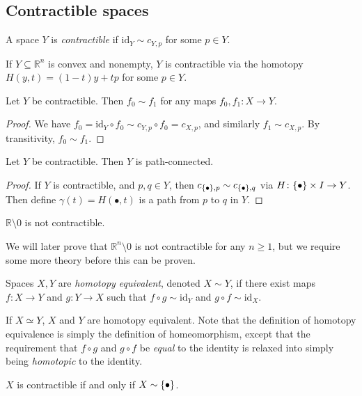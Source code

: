 \subsection{Contractible spaces}
\begin{definition}
	A space \( Y \) is \emph{contractible} if \( \mathrm{id}_Y \sim c_{Y,p} \) for some \( p \in Y \).
\end{definition}
\begin{example}
	If \( Y \subseteq \mathbb R^n \) is convex and nonempty, \( Y \) is contractible via the homotopy \( H(y,t) = (1-t)y + tp \) for some \( p \in Y \).
\end{example}
\begin{proposition}
	Let \( Y \) be contractible.
	Then \( f_0 \sim f_1 \) for any maps \( f_0, f_1 \colon X \to Y \).
\end{proposition}
\begin{proof}
	We have \( f_0 = \mathrm{id}_Y \circ f_0 \sim c_{Y,p} \circ f_0 = c_{X,p} \), and similarly \( f_1 \sim c_{X,p} \).
	By transitivity, \( f_0 \sim f_1 \).
\end{proof}
\begin{corollary}
	Let \( Y \) be contractible.
	Then \( Y \) is path-connected.
\end{corollary}
\begin{proof}
	If \( Y \) is contractible, and \( p, q \in Y \), then \( c_{\qty{\bullet},p} \sim c_{\qty{\bullet},q} \) via \( H \colon \qty{\bullet} \times I \to Y \).
	Then define \( \gamma(t) = H(\bullet,t) \) is a path from \( p \) to \( q \) in \( Y \).
\end{proof}
\begin{example}
	\( \mathbb R \setminus \qty{0} \) is not contractible.
\end{example}
We will later prove that \( \mathbb R^n \setminus \qty{0} \) is not contractible for any \( n \geq 1 \), but we require some more theory before this can be proven.
\begin{definition}
	Spaces \( X, Y \) are \emph{homotopy equivalent}, denoted \( X \sim Y \), if there exist maps \( f \colon X \to Y \) and \( g \colon Y \to X \) such that \( f \circ g \sim \mathrm{id}_Y \) and \( g \circ f \sim \mathrm{id}_X \).
\end{definition}
\begin{example}
	If \( X \simeq Y \), \( X \) and \( Y \) are homotopy equivalent.
	Note that the definition of homotopy equivalence is simply the definition of homeomorphism, except that the requirement that \( f \circ g \) and \( g \circ f \) be \emph{equal} to the identity is relaxed into simply being \emph{homotopic} to the identity.
\end{example}
\begin{proposition}
	\( X \) is contractible if and only if \( X \sim \qty{\bullet} \).
\end{proposition}
